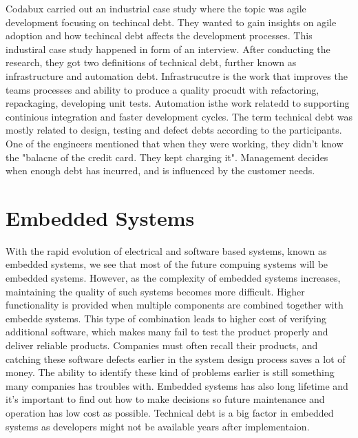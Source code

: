 Codabux carried out an industrial case study where the topic was agile development focusing on techincal debt\cite{p8-codabux}. They wanted to gain insights on agile adoption and how techincal debt affects the development processes. This industiral case study happened in form of an interview. After conducting the research, they got two definitions of technical debt, further known as infrastructure and automation debt. Infrastrucutre is the work that improves the teams processes and ability to produce a quality procudt with refactoring, repackaging, developing unit tests. Automation isthe work relatedd to supporting continious integration and faster development cycles. The term technical debt was mostly related to design, testing and defect debts according to the participants. One of the engineers mentioned that when they were working, they didn't know the "balacne of the credit card. They kept charging it". Management decides when enough debt has incurred, and is influenced by the customer needs.











\section{Embedded Systems}
With the rapid evolution of electrical and software based systems, known as embedded systems, we see that most of the future compuing systems will be embedded systems\cite{wolfmadsen-2000}. However, as the complexity of embedded systems increases, maintaining the quality of such systems becomes more difficult. Higher functionality is provided when multiple components are combined together with embedde systems. This type of combination leads to higher cost of verifying additional software, which makes many fail to test the product properly and deliver reliable products. Companies must often recall their products, and catching these software defects earlier in the system design process saves a lot of money. The ability to identify these kind of problems earlier is still something many companies has troubles with. Embedded systems has also long lifetime and it's important to find out how to make decisions so future maintenance and operation has low cost as possible. Technical debt is a big factor in embedded systems as developers might not be available years after implementaion. 

